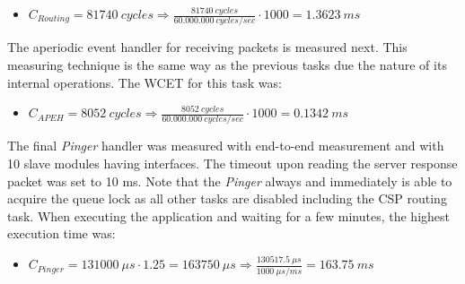 \begin{itemize}
	\item $C_{Routing} = 81740\ cycles \Rightarrow \frac{81740\ cycles}{60.000.000\ cycles/sec} \cdot 1000 = 1.3623\ ms$
\end{itemize}

The aperiodic event handler for receiving packets is measured next. This measuring technique is the same way as the previous tasks due the nature of its internal operations. The WCET for this task was:

\begin{itemize}
	\item $C_{APEH} = 8052\ cycles \Rightarrow \frac{8052\ cycles}{60.000.000\ cycles/sec} \cdot 1000 = 0.1342\ ms$
\end{itemize}

The final \textit{Pinger} handler was measured with end-to-end measurement and with 10 slave modules having \iic interfaces. The timeout upon reading the server response packet was set to 10 ms. Note that the \textit{Pinger} always and immediately is able to acquire the queue lock as all other tasks are disabled including the CSP routing task. When executing the application and waiting for a few minutes, the highest execution time was:

\begin{itemize}
	\item $C_{Pinger} = 131000\ \mu s \cdot 1.25 = 163750\ \mu s \Rightarrow \frac{130517.5\ \mu s}{1000\ \mu s /ms} = 163.75\ ms$
\end{itemize}
